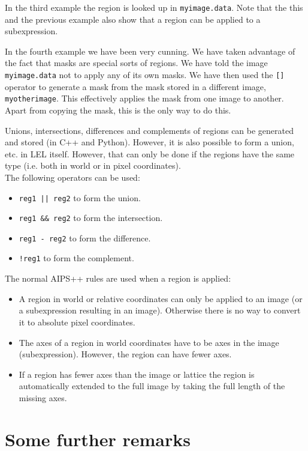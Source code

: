 \medskip\noindent In the third example the region is looked up in \texttt{myimage.data}.
Note that the this and the previous example also show that a region can be applied
to a subexpression.

\medskip\noindent In the fourth example we have been very cunning.  We have taken
advantage of the fact that masks are special sorts of regions.  We have
told the image {\tt myimage.data} not to apply any of its own masks.  We
have then used the {\tt []} operator to generate a mask from the mask
stored in a different image, {\tt myotherimage}.  This effectively
applies the mask from one image to another.  Apart from copying the
mask, this is the only way to do this. 

\medskip\noindent Unions, intersections, differences and complements of regions can be
generated and stored (in C++ and Python).  However, it is also possible
to form a union, etc.  in LEL itself.  However, that can only be done if
the regions have the same type (i.e.  both in world or in pixel
coordinates). 
\\The following operators can be used:

\begin{itemize}
\item {\tt reg1 || reg2} to form the union.
\item {\tt reg1 \&\& reg2} to form the intersection.
\item {\tt reg1 - reg2} to form the difference.
\item {\tt !reg1} to form the complement.
\end{itemize}

The normal AIPS++ rules are used when a region is applied:

\begin{itemize}
\item A region in world or relative coordinates can only be applied
to an image (or a subexpression resulting in an image). Otherwise
there is no way to convert it to absolute pixel coordinates.
\item The axes of a region in world coordinates have to be axes in
the image (subexpression). However, the region can have fewer axes.
\item If a region has fewer axes than the image or lattice
the region is automatically extended to the full image
by taking the full length of the missing axes.
\end{itemize}


\section{Some further remarks}

